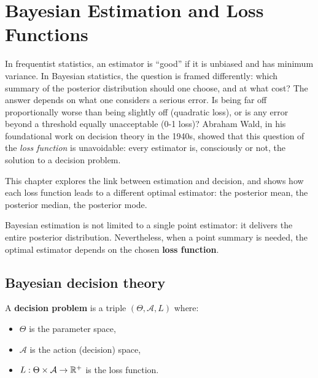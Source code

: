 \chapter{Bayesian Estimation and Loss Functions}
\label{ch:estimation}

In frequentist statistics, an estimator is ``good'' if it is unbiased and has minimum variance. In Bayesian statistics, the question is framed differently: which summary of the posterior distribution should one choose, and at what cost? The answer depends on what one considers a serious error. Is being far off proportionally worse than being slightly off (quadratic loss), or is any error beyond a threshold equally unacceptable (0-1 loss)? Abraham Wald, in his foundational work on decision theory in the 1940s, showed that this question of the \emph{loss function} is unavoidable: every estimator is, consciously or not, the solution to a decision problem.

This chapter explores the link between estimation and decision, and shows how each loss function leads to a different optimal estimator: the posterior mean, the posterior median, the posterior mode.

\begin{intuition}[title=\textbf{Central idea}]
Bayesian estimation is not limited to a single point estimator: it
delivers the entire posterior distribution. Nevertheless, when a point
summary is needed, the optimal estimator depends on the chosen
\textbf{loss function}.
\end{intuition}

\section{Bayesian decision theory}

\begin{definition}
A \textbf{decision problem} is a triple $(\Theta, \mathcal{A}, L)$
where:
\begin{itemize}
  \item $\Theta$ is the parameter space,
  \item $\mathcal{A}$ is the action (decision) space,
  \item $L : \Theta \times \mathcal{A} \to \mathbb{R}^+$ is the loss function.
\end{itemize}
\end{definition}


